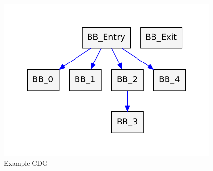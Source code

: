 \begin{figure}[p]
  \begin{center}
    \includegraphics{chap-examples/cdg.pdf}
  \end{center}
  \caption{Example CDG}
  \label{fig:cdg}
\end{figure}

